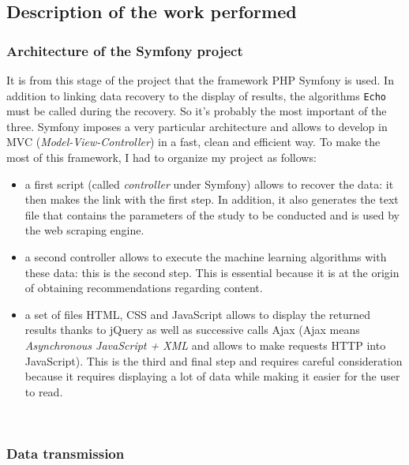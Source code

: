 \documentclass[12pt]{article}
\begin{document}
\subsection{Description of the work performed}

\subsubsection{Architecture of the Symfony project}

It is from this stage of the project that the framework \textsf{PHP} \textsf{Symfony} is used. In addition to linking data recovery to the display of results, the algorithms \texttt{Echo} must be called during the recovery. So it's probably the most important of the three. \textsf{Symfony} imposes a very particular architecture and allows to develop in MVC (\textit{Model-View-Controller}) in a fast, clean and efficient way. To make the most of this framework, I had to organize my project as follows: 
\begin{itemize}
	\item a first script (called \textit{controller} under \textsf{Symfony}) allows to recover the data: it then makes the link with the first step. In addition, it also generates the text file that contains the parameters of the study to be conducted and is used by the web scraping engine.  
	\item a second controller allows to execute the machine learning algorithms with these data: this is the second step. This is essential because it is at the origin of obtaining recommendations regarding content.
	\item a set of files \textsf{HTML}, \textsf{CSS} and \textsf{JavaScript} allows to display the returned results thanks to \textsf{jQuery} as well as successive calls \textsf{Ajax} (\textsf{Ajax} means \textit{Asynchronous JavaScript + XML} and allows to make requests \textsf{HTTP} into \textsf{JavaScript}). This is the third and final step and requires careful consideration because it requires displaying a lot of data while making it easier for the user to read.
\end{itemize}

\

\subsubsection{Data transmission}
\end{document}
